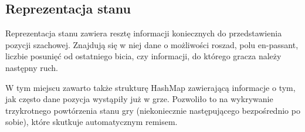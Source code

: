 \subsection{Reprezentacja stanu}
\label{subsec:reprezentacja-stanu}

Reprezentacja stanu zawiera resztę informacji koniecznych do przedstawienia pozycji szachowej.
Znajdują się w niej dane o możliwości roszad, polu en-passant, liczbie posunięć od ostatniego bicia, czy informacji, do którego gracza należy następny ruch.

W tym miejscu zawarto także strukturę HashMap zawierającą informacje o tym, jak często dane pozycja wystąpiły już w grze.
Pozwoliło to na wykrywanie trzykrotnego powtórzenia stanu gry (niekoniecznie następującego bezpośrednio po sobie), które skutkuje automatycznym remisem.